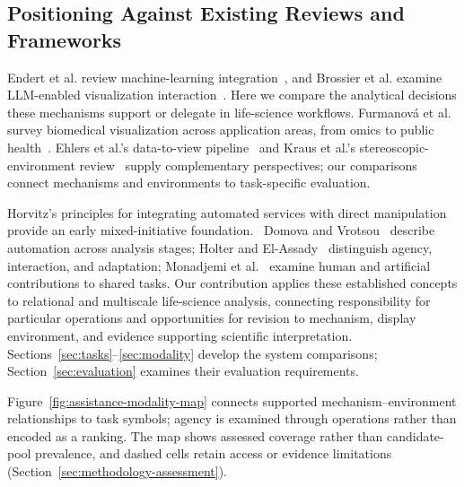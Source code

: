 \subsection{Positioning Against Existing Reviews and Frameworks}
\label{subsection:priorreviews}

Endert et al. review machine-learning integration~\cite{Endert2017Integration}, and Brossier et al. examine LLM-enabled visualization interaction~\cite{Brossier2026LLM}. Here we compare the analytical decisions these mechanisms support or delegate in life-science workflows. Furmanov{\'a} et al. survey biomedical visualization across application areas, from omics to public health~\cite{Furmanova2024BiomedicalVisualization}. Ehlers et al.'s data-to-view pipeline~\cite{Ehlers2025} and Kraus et al.'s stereoscopic-environment review~\cite{Kraus2022ImmersiveAnalyticsSurvey} supply complementary perspectives; our comparisons connect mechanisms and environments to task-specific evaluation.

Horvitz's principles for integrating automated services with direct manipulation provide an early mixed-initiative foundation.~\cite{Horvitz1999MixedInitiative} Domova and Vrotsou~\cite{DomovaVrotsou2023Automation} describe automation across analysis stages; Holter and El-Assady~\cite{HolterElAssady2024Agency} distinguish agency, interaction, and adaptation; Monadjemi et al.~\cite{Monadjemi2026MixedInitiative} examine human and artificial contributions to shared tasks. Our contribution applies these established concepts to relational and multiscale life-science analysis, connecting responsibility for particular operations and opportunities for revision to mechanism, display environment, and evidence supporting scientific interpretation. Sections~\ref{sec:tasks}--\ref{sec:modality} develop the system comparisons; Section~\ref{sec:evaluation} examines their evaluation requirements.

Figure~\ref{fig:assistance-modality-map} connects supported mechanism--environment relationships to task symbols; agency is examined through operations rather than encoded as a ranking. The map shows assessed coverage rather than candidate-pool prevalence, and dashed cells retain access or evidence limitations (Section~\ref{sec:methodology-assessment}).

